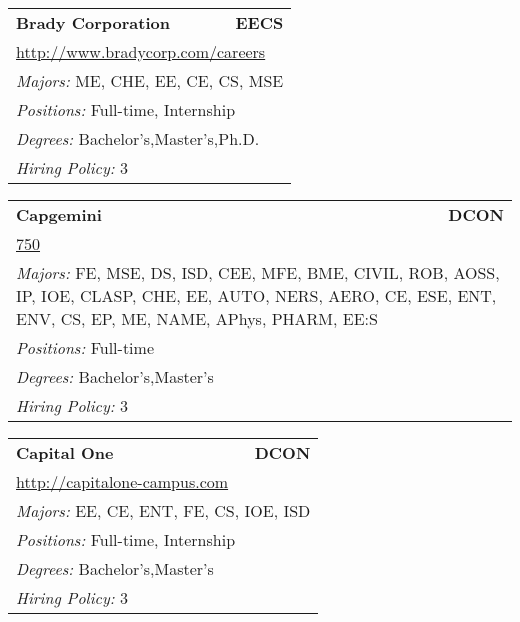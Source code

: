 \documentclass[twoside]{article}
\begin{document}
\begin{center}
\begin{multicols}{3}
\begin{FlushLeft}
\begin{minipage}{\columnwidth}
\end{minipage}
 
\begin{minipage}{\columnwidth}\begin{tabularx}{.95\columnwidth}{Xr}
                 {\Large\bf Brady Corporation} & {\Large\bf EECS}\\
    \multicolumn{2}{p{.95\columnwidth}}{\url{http://www.bradycorp.com/careers}}\\
    \multicolumn{2}{p{.95\columnwidth}}{\emph{Majors:} ME, CHE, EE, CE, CS, MSE}\\
    \multicolumn{2}{p{.95\columnwidth}}{\emph{Positions:} Full-time, Internship}\\
    \multicolumn{2}{p{.95\columnwidth}}{\emph{Degrees:} Bachelor's,Master's,Ph.D.}\\
    \multicolumn{2}{p{.95\columnwidth}}{\emph{Hiring Policy:} 3}\\
    \end{tabularx}
    
\end{minipage}
 
\begin{minipage}{\columnwidth}\begin{tabularx}{.95\columnwidth}{Xr}
                 {\Large\bf Capgemini} & {\Large\bf DCON}\\
    \multicolumn{2}{p{.95\columnwidth}}{\url{750}}\\
    \multicolumn{2}{p{.95\columnwidth}}{\emph{Majors:} FE, MSE, DS, ISD, CEE, MFE, BME, CIVIL, ROB, AOSS, IP, IOE, CLASP, CHE, EE, AUTO, NERS, AERO, CE, ESE, ENT, ENV, CS, EP, ME, NAME, APhys, PHARM, EE:S}\\
    \multicolumn{2}{p{.95\columnwidth}}{\emph{Positions:} Full-time}\\
    \multicolumn{2}{p{.95\columnwidth}}{\emph{Degrees:} Bachelor's,Master's}\\
    \multicolumn{2}{p{.95\columnwidth}}{\emph{Hiring Policy:} 3}\\
    \end{tabularx}
    
\end{minipage}
 
\begin{minipage}{\columnwidth}\begin{tabularx}{.95\columnwidth}{Xr}
                 {\Large\bf Capital One} & {\Large\bf DCON}\\
    \multicolumn{2}{p{.95\columnwidth}}{\url{http://capitalone-campus.com}}\\
    \multicolumn{2}{p{.95\columnwidth}}{\emph{Majors:} EE, CE, ENT, FE, CS, IOE, ISD}\\
    \multicolumn{2}{p{.95\columnwidth}}{\emph{Positions:} Full-time, Internship}\\
    \multicolumn{2}{p{.95\columnwidth}}{\emph{Degrees:} Bachelor's,Master's}\\
    \multicolumn{2}{p{.95\columnwidth}}{\emph{Hiring Policy:} 3}\\
    \end{tabularx}
    

\end{minipage}
\end{FlushLeft}
\end{multicols}
\end{center}
\end{document}
